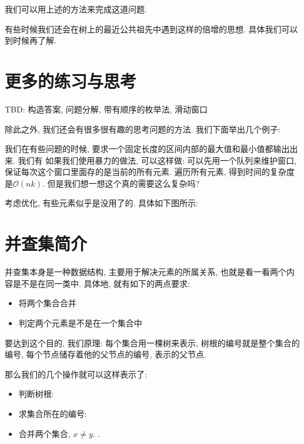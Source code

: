  我们可以用上述的方法来完成这道问题. 

有些时候我们还会在树上的最近公共祖先中遇到这样的倍增的思想. 具体我们可以到时候再了解. 

\section{更多的练习与思考}

TBD: 构造答案, 问题分解, 带有顺序的枚举法, 滑动窗口

除此之外, 我们还会有很多很有趣的思考问题的方法. 我们下面举出几个例子: 

 我们在有些问题的时候, 要求一个固定长度的区间内部的最大值和最小值都输出出来. 我们有
如果我们使用暴力的做法, 可以这样做: 可以先用一个队列来维护窗口, 保证每次这个窗口里面存的是当前的所有元素. 
遍历所有元素, 得到时间的复杂度是$\mathcal O(nk)$. 但是我们想一想这个真的需要这么复杂吗? 

考虑优化, 有些元素似乎是没用了的. 具体如下图所示: 


\section{并查集简介}

并查集本身是一种数据结构, 主要用于解决元素的所属关系, 也就是看一看两个内容是不是在同一类中. 
具体地, 就有如下的两点要求: 
\begin{itemize}
    \item 将两个集合合并
    \item 判定两个元素是不是在一个集合中
\end{itemize}

要达到这个目的, 我们原理: 每个集合用一棵树来表示, 树根的编号就是整个集合的编号, 
每个节点储存着他的父节点的编号, 表示的父节点. 

那么我们的几个操作就可以这样表示了: 
\begin{itemize}
    \item 判断树根: 
    \item 求集合所在的编号: 
    \item 合并两个集合, $x\neq y$. .
\end{itemize}